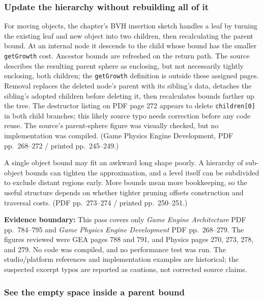 \subsubsection{Update the hierarchy without rebuilding all of it}\label{06-engine-ii-ch033-update-the-hierarchy-without-rebuilding-all-of-it}

For moving objects, the chapter's BVH insertion sketch handles a leaf by turning the existing leaf and new object into two children, then recalculating the parent bound. At an internal node it descends to the child whose bound has the smaller \texttt{getGrowth} cost. Ancestor bounds are refreshed on the return path. The source describes the resulting parent sphere as enclosing, but not necessarily tightly enclosing, both children; the \texttt{getGrowth} definition is outside these assigned pages. Removal replaces the deleted node's parent with its sibling's data, detaches the sibling's adopted children before deleting it, then recalculates bounds farther up the tree. The destructor listing on PDF page 272 appears to delete \texttt{children{[}0{]}} in both child branches; this likely source typo needs correction before any code reuse. The source's parent-sphere figure was visually checked, but no implementation was compiled. (Game Physics Engine Development, PDF pp.~268--272 / printed pp.~245--249.)

A single object bound may fit an awkward long shape poorly. A hierarchy of sub-object bounds can tighten the approximation, and a level itself can be subdivided to exclude distant regions early. More bounds mean more bookkeeping, so the useful structure depends on whether tighter pruning offsets construction and traversal costs. (PDF pp.~273--274 / printed pp.~250--251.)

\textbf{Evidence boundary:} This pass covers only \emph{Game Engine Architecture} PDF pp.~784--795 and \emph{Game Physics Engine Development} PDF pp.~268--279. The figures reviewed were GEA pages 788 and 791, and Physics pages 270, 273, 278, and 279. No code was compiled, and no performance test was run. The studio/platform references and implementation examples are historical; the suspected excerpt typos are reported as cautions, not corrected source claims.

\subsubsection{See the empty space inside a parent bound}\label{06-engine-ii-ch033-see-the-empty-space-inside-a-parent-bound}

